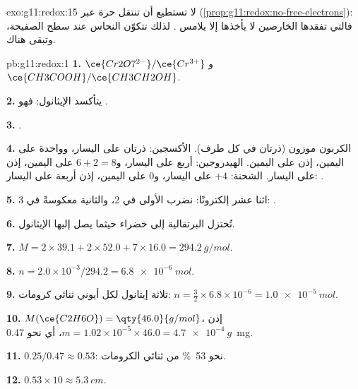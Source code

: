 \begin{solution}{exo:g11:redox:15}
لا تستطيع  أن تنتقل حرة عبر 
(\cref{prop:g11:redox:no-free-electrons}): فالتي تفقدها  الخارصين لا
يأخذها إلا   يلامس . لذلك تتكوّن  النحاس
عند سطح الصفيحة، وتبقى هناك.
\end{solution}

\begin{solution}{pb:g11:redox:1}
\textbf{1.} $\ce{Cr2O7^{2-}}/\ce{Cr^{3+}}$ و$\ce{CH3COOH}/\ce{CH3CH2OH}$.

\textbf{2.} يتأكسد الإيثانول: فهو .

\textbf{3.} .

\textbf{4.} الكربون موزون (ذرتان في كل طرف). الأكسجين: ذرتان على
اليسار، وواحدة على اليمين، إذن  على اليمين. الهيدروجين: أربع على
اليسار، و$6 + 2 = 8$ على اليمين، إذن  على اليسار. الشحنة: $+4$ على
اليسار، و0 على اليمين، إذن أربعة  على اليسار:
.

\textbf{5.} اثنا عشر إلكترونًا: نضرب الأولى في 2، والثانية معكوسةً
في 3:
.

\textbf{6.} تُختزل   البرتقالية إلى  
خضراء حيثما يصل إليها الإيثانول.

\textbf{7.} $M = 2\times 39.1 + 2\times 52.0 + 7\times 16.0 =
\qty{294.2}{g/mol}$.

\textbf{8.} $n = 2.0\times 10^{-3}/294.2 = \qty{6.8e-6}{mol}$.

\textbf{9.} ثلاثة  إيثانول لكل أيوني ثنائي كرومات:
$n = \tfrac{3}{2}\times 6.8\times 10^{-6} = \qty{1.0e-5}{mol}$.

\textbf{10.} $M(\ce{C2H6O}) = \qty{46.0}{g/mol}$، إذن
$m = 1.02\times 10^{-5}\times 46.0 = \qty{4.7e-4}{g}$، أي نحو
\qty{0.47}{mg}.

\textbf{11.} $0.25/0.47 \approx 0.53$: نحو \qty{53}{\percent} من
ثنائي الكرومات.

\textbf{12.} $0.53 \times 10 \approx \qty{5.3}{cm}$.


\end{solution}
